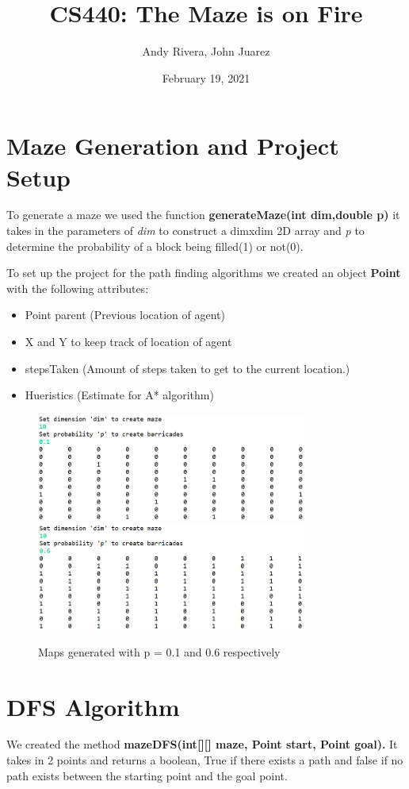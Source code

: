\documentclass{article}
\title{CS440: The Maze is on Fire}
\author{Andy Rivera, John Juarez}
\date{February 19, 2021}
\begin{document}
\maketitle

\section{Maze Generation and Project Setup}
   To generate a maze we used the function \textbf{generateMaze(int dim,double p)} it takes in the parameters of  \textit{dim} to construct a dimxdim 2D array and \textit{p} to determine the probability of a block being filled(1) or not(0).
   
   To set up the project for the path finding algorithms we created an object \textbf{Point} with the following attributes:
   \begin{itemize}
   \item Point parent (Previous location of agent)
   \item X and Y to keep track of location of agent
   \item stepsTaken (Amount of steps taken to get to the current location.)
   \item Hueristics (Estimate for A* algorithm)
   \end{itemize}

\begin{figure}[hpt]

\centering
\includegraphics[width=3.5in]{maze1}\hfill
\includegraphics[width=3.5in]{maze3}

\caption{Maps generated with p = 0.1 and 0.6 respectively}
\label{fig:figure1}

\end{figure}


\section{DFS Algorithm}
 We created the method \textbf{mazeDFS(int[][] maze, Point start, Point goal).} It takes in 2 points and returns a boolean, True if there exists a path and false if no path exists between the starting point and the goal point. 
	
\end{document}
